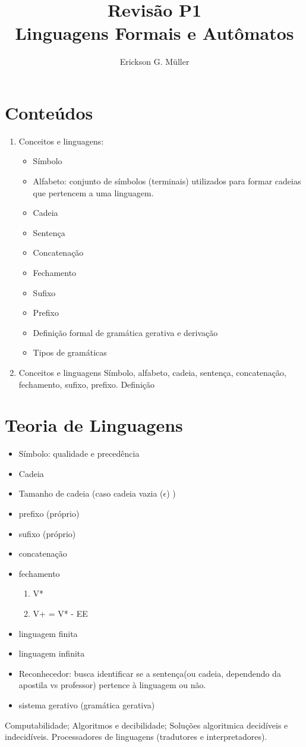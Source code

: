 \documentclass[]{article}
\title{Revisão P1\\Linguagens Formais e Autômatos}
\author{Erickson G. Müller}
\date{}
\begin{document}
	\maketitle
	\section{Conteúdos}
		\begin{enumerate}
			\item Conceitos e linguagens: 
			\begin{itemize}
				\item Símbolo
				\item Alfabeto: conjunto de símbolos (terminais) utilizados para formar cadeias que pertencem a uma linguagem.
				\item Cadeia
				\item Sentença 
				\item Concatenação
				\item Fechamento 
				\item Sufixo
				\item Prefixo
				\item Definição formal de gramática gerativa e derivação
				\item Tipos de gramáticas
			\end{itemize}
			\item Conceitos e linguagens
				Símbolo, alfabeto, cadeia, sentença, concatenação, fechamento, sufixo, prefixo. Definição
		\end{enumerate}
	\section{Teoria de Linguagens}
		\begin{itemize}
			\item Símbolo: qualidade e precedência
			\item Cadeia
			\item Tamanho de cadeia (caso cadeia vazia ($\epsilon$) )%
			\item prefixo (próprio)
			\item sufixo (próprio)
			\item concatenação
			\item fechamento
			\begin{enumerate}
				\item V*
				\item V+ = V* - {EE}
			\end{enumerate}
			\item linguagem finita
			\item linguagem infinita
			\item Reconhecedor: busca identificar se a sentença(ou cadeia, dependendo da apostila vs professor) pertence à linguagem ou não.
			\item sistema gerativo (gramática gerativa)

		\end{itemize}
		Computabilidade; Algoritmos e decibilidade; Soluções algoritmica decidíveis e indecidíveis. Processadores de linguagens (tradutores e interpretadores).
		
\end{document}
